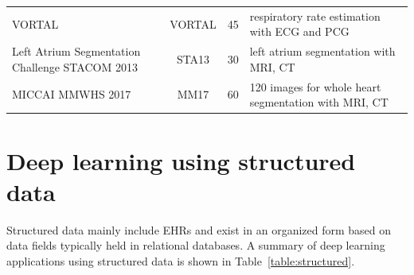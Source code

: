 \documentclass[journal]{IEEEtran}
\begin{document}
\begin{table}[!t]
\begin{minipage}{\textwidth}
\begin{tabularx}{\textwidth}{l c r l}
			\midrule
			VORTAL\cite{charlton2016assessment}                                                           & VORTAL          & 45                                                                                & respiratory rate estimation with ECG and PCG                 \\
			Left Atrium Segmentation Challenge STACOM 2013\cite{tobon2015benchmark}                       & STA13           & 30                                                                                & left atrium segmentation with MRI, CT                        \\
			MICCAI MMWHS 2017\cite{zhuang2016multi}                                                       & MM17            & 60                                                                                & 120 images for whole heart segmentation with MRI, CT         \\
			\bottomrule
		\end{tabularx}
	\end{minipage}
\end{table}

\section{Deep learning using structured data}
\label{sec:structured}
Structured data mainly include EHRs and exist in an organized form based on data fields typically held in relational databases.
A summary of deep learning applications using structured data is shown in Table~\ref{table:structured}.
\end{document}
